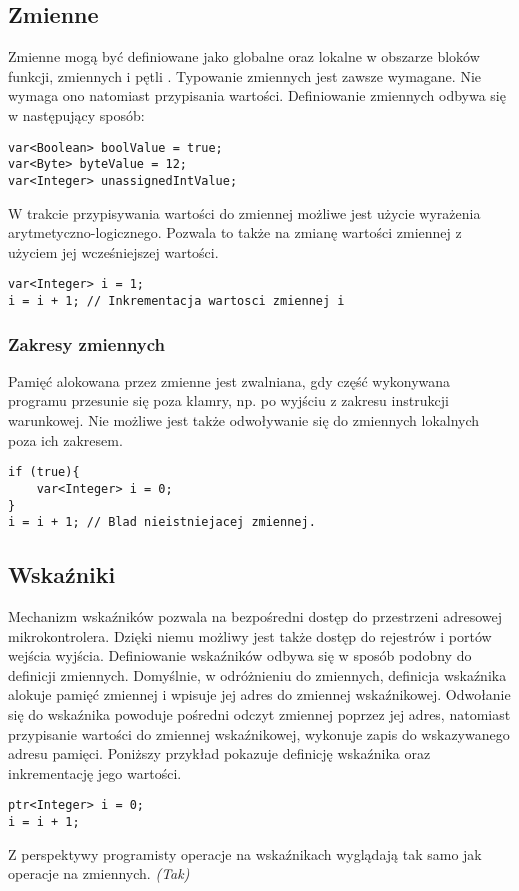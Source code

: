 \subsection{Zmienne}
Zmienne mogą być definiowane jako globalne oraz lokalne w obszarze bloków funkcji, zmiennych i pętli . Typowanie zmiennych jest zawsze wymagane. Nie wymaga ono natomiast przypisania wartości. Definiowanie zmiennych odbywa się w następujący sposób:
\begin{lstlisting}
var<Boolean> boolValue = true;
var<Byte> byteValue = 12;
var<Integer> unassignedIntValue;
\end{lstlisting}
W trakcie przypisywania wartości do zmiennej możliwe jest użycie wyrażenia arytmetyczno-logicznego. Pozwala to także na zmianę wartości zmiennej z użyciem jej wcześniejszej wartości.
\begin{lstlisting}
var<Integer> i = 1;
i = i + 1; // Inkrementacja wartosci zmiennej i
\end{lstlisting}
\subsubsection{Zakresy zmiennych}
Pamięć alokowana przez zmienne jest zwalniana, gdy część wykonywana programu przesunie się poza klamry, np. po wyjściu z zakresu instrukcji warunkowej. Nie możliwe jest także odwoływanie się do zmiennych lokalnych poza ich zakresem.
\begin{lstlisting}
if (true){
	var<Integer> i = 0;
}
i = i + 1; // Blad nieistniejacej zmiennej.
\end{lstlisting}
\subsection{Wskaźniki}
Mechanizm wskaźników pozwala na bezpośredni dostęp do przestrzeni adresowej mikrokontrolera. Dzięki niemu możliwy jest także dostęp do rejestrów i portów wejścia wyjścia.
Definiowanie wskaźników odbywa się w sposób podobny do definicji zmiennych. Domyślnie, w odróżnieniu do zmiennych, definicja wskaźnika alokuje pamięć zmiennej i wpisuje jej adres do zmiennej wskaźnikowej. Odwołanie się do wskaźnika powoduje pośredni odczyt zmiennej poprzez jej adres, natomiast przypisanie wartości do zmiennej wskaźnikowej, wykonuje zapis do wskazywanego adresu pamięci. Poniższy przykład pokazuje definicję wskaźnika oraz inkrementację jego wartości.
\begin{lstlisting}
ptr<Integer> i = 0;
i = i + 1;
\end{lstlisting}
Z perspektywy programisty operacje na wskaźnikach wyglądają tak samo jak operacje na zmiennych.
 \textit{(Tak)}

